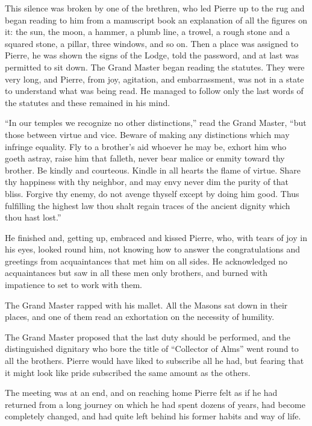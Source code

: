 This silence was broken by one of the brethren, who led Pierre up
to the rug and began reading to him from a manuscript book an
explanation of all the figures on it: the sun, the moon, a
hammer, a plumb line, a trowel, a rough stone and a squared
stone, a pillar, three windows, and so on. Then a place was
assigned to Pierre, he was shown the signs of the Lodge, told the
password, and at last was permitted to sit down. The Grand Master
began reading the statutes. They were very long, and Pierre, from
joy, agitation, and embarrassment, was not in a state to
understand what was being read. He managed to follow only the
last words of the statutes and these remained in his mind.

``In our temples we recognize no other distinctions,'' read the
Grand Master, ``but those between virtue and vice. Beware of
making any distinctions which may infringe equality. Fly to a
brother's aid whoever he may be, exhort him who goeth astray,
raise him that falleth, never bear malice or enmity toward thy
brother. Be kindly and courteous.  Kindle in all hearts the flame
of virtue. Share thy happiness with thy neighbor, and may envy
never dim the purity of that bliss. Forgive thy enemy, do not
avenge thyself except by doing him good. Thus fulfilling the
highest law thou shalt regain traces of the ancient dignity which
thou hast lost.''

He finished and, getting up, embraced and kissed Pierre, who,
with tears of joy in his eyes, looked round him, not knowing how
to answer the congratulations and greetings from acquaintances
that met him on all sides. He acknowledged no acquaintances but
saw in all these men only brothers, and burned with impatience to
set to work with them.

The Grand Master rapped with his mallet. All the Masons sat down
in their places, and one of them read an exhortation on the
necessity of humility.

The Grand Master proposed that the last duty should be performed,
and the distinguished dignitary who bore the title of ``Collector
of Alms'' went round to all the brothers. Pierre would have liked
to subscribe all he had, but fearing that it might look like
pride subscribed the same amount as the others.

The meeting was at an end, and on reaching home Pierre felt as if
he had returned from a long journey on which he had spent dozens
of years, had become completely changed, and had quite left
behind his former habits and way of life.


